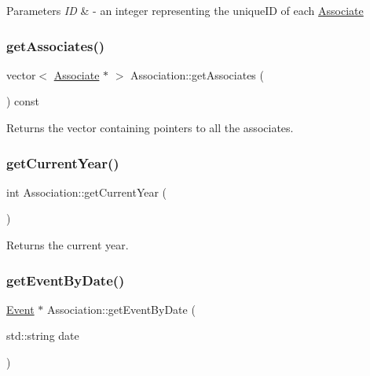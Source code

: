 \begin{DoxyParams}{Parameters}
{\em ID} & -\/ an integer representing the unique\+ID of each \hyperlink{classAssociate}{Associate} \\
\hline
\end{DoxyParams}
\mbox{\label{classAssociation_af6e7c1821490bb43b00b58cb5be84cd7}} 
\subsubsection{\texorpdfstring{get\+Associates()}{getAssociates()}}
{\footnotesize\ttfamily vector$<$ \hyperlink{classAssociate}{Associate} $\ast$ $>$ Association\+::get\+Associates (\begin{DoxyParamCaption}{ }\end{DoxyParamCaption}) const}



Returns the vector containing pointers to all the associates. 

\mbox{\label{classAssociation_a92f8779f17716e9dcd206f63f888403c}} 
\subsubsection{\texorpdfstring{get\+Current\+Year()}{getCurrentYear()}}
{\footnotesize\ttfamily int Association\+::get\+Current\+Year (\begin{DoxyParamCaption}{ }\end{DoxyParamCaption})\hspace{0.3cm}{\ttfamily [static]}}



Returns the current year. 

\mbox{\label{classAssociation_a670730087770a5915828a9412ce681c8}} 
\subsubsection{\texorpdfstring{get\+Event\+By\+Date()}{getEventByDate()}}
{\footnotesize\ttfamily \hyperlink{classEvent}{Event} $\ast$ Association\+::get\+Event\+By\+Date (\begin{DoxyParamCaption}\item[{std\+::string}]{date }\end{DoxyParamCaption})}



